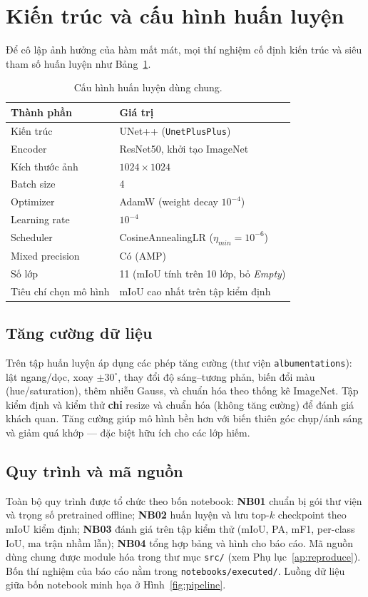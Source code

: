\section{Kiến trúc và cấu hình huấn luyện}

Để cô lập ảnh hưởng của hàm mất mát, mọi thí nghiệm cố định kiến trúc và siêu tham
số huấn luyện như Bảng~\ref{tab:config}.

\begin{table}[H]
\centering
\caption{Cấu hình huấn luyện dùng chung.}
\label{tab:config}
\begin{tabular}{l l}
\toprule
\textbf{Thành phần} & \textbf{Giá trị} \\
\midrule
Kiến trúc            & UNet++ (\texttt{UnetPlusPlus}) \\
Encoder              & ResNet50, khởi tạo ImageNet \\
Kích thước ảnh       & $1024 \times 1024$ \\
Batch size           & 4 \\
Optimizer            & AdamW (weight decay $10^{-4}$) \\
Learning rate        & $10^{-4}$ \\
Scheduler            & CosineAnnealingLR ($\eta_{min}=10^{-6}$) \\
Mixed precision      & Có (AMP) \\
Số lớp               & 11 (mIoU tính trên 10 lớp, bỏ \textit{Empty}) \\
Tiêu chí chọn mô hình& mIoU cao nhất trên tập kiểm định \\
\bottomrule
\end{tabular}
\end{table}

\subsection{Tăng cường dữ liệu}
Trên tập huấn luyện áp dụng các phép tăng cường (thư viện \texttt{albumentations}):
lật ngang/dọc, xoay $\pm30^\circ$, thay đổi độ sáng--tương phản, biến đổi màu
(hue/saturation), thêm nhiễu Gauss, và chuẩn hóa theo thống kê ImageNet. Tập kiểm
định và kiểm thử \textbf{chỉ} resize và chuẩn hóa (không tăng cường) để đánh giá khách
quan. Tăng cường giúp mô hình bền hơn với biến thiên góc chụp/ánh sáng và giảm
quá khớp --- đặc biệt hữu ích cho các lớp hiếm.

\subsection{Quy trình và mã nguồn}
Toàn bộ quy trình được tổ chức theo bốn notebook: \textbf{NB01} chuẩn bị gói thư viện
và trọng số pretrained offline; \textbf{NB02} huấn luyện và lưu top-$k$ checkpoint
theo mIoU kiểm định; \textbf{NB03} đánh giá trên tập kiểm thử (mIoU, PA, mF1,
per-class IoU, ma trận nhầm lẫn); \textbf{NB04} tổng hợp bảng và hình cho báo cáo. Mã
nguồn dùng chung được module hóa trong thư mục \texttt{src/} (xem
Phụ lục~\ref{ap:reproduce}). Bốn thí nghiệm của báo cáo nằm trong
\texttt{notebooks/executed/}. Luồng dữ liệu giữa bốn notebook minh họa ở
Hình~\ref{fig:pipeline}.

